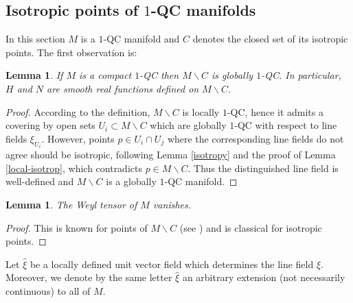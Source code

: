 \documentclass[10pt]{amsart}
\let\moins\smallsetminus
\newtheorem{lemma}[theorem]{Lemma}
\theoremstyle{definition}
\theoremstyle{remark}
\numberwithin{equation}{section}
\begin{document}
\subsection{Isotropic points of $1$-QC manifolds}\label{section-extension}
In this section $M$ is a $1$-QC manifold and $C$ denotes the closed set of its isotropic points.
The first observation is:
\begin{lemma}\label{global}
If $M$ is a compact $1$-QC then $M\moins C$ is globally $1$-QC. In particular, $H$ and $N$ are smooth
real functions defined on $M\moins C$.
\end{lemma}
\begin{proof}
According to the definition, $M\moins C$ is locally $1$-QC, hence it admits a covering by open sets $U_i\subset M\moins C$
which are globally $1$-QC with respect to line fields $\xi_{U_i}$.
However, points $p\in U_i\cap U_j$ where the corresponding line fields do not agree should be
isotropic, following Lemma \ref{isotropy} and the proof of Lemma \ref{local-isotrop}, which
contradicts $p\in M\moins C$. Thus the distinguished
line field is well-defined and $M\moins C$ is a globally $1$-QC manifold.
\end{proof}

\begin{lemma}\label{weyl}
The Weyl tensor of $M$ vanishes.
\end{lemma}
\begin{proof}
This is known for points of $M\moins C$ (see \cite{BF,GM}) and is classical for isotropic points.
\end{proof}

Let $\widehat{\xi}$ be a locally defined unit vector field
which determines the line field $\xi$.
Moreover, we denote by the same letter $\widehat{\xi}$ an arbitrary extension
(not necessarily continuous) to all of $M$.
\end{document}
